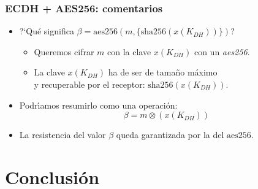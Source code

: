 \documentclass{beamer}
\theoremstyle{plain}        			%
\theoremstyle{definition}   			%
\theoremstyle{saltolinea}   			%
\begin{document}
\begin{frame}
\frametitle{ECDH + AES256: comentarios}
	\pause
	\begin{itemize}[<+-| alert@+>]
		\item ?`Qu\'e significa $\beta=\textrm{aes256}(m,\{\textrm{sha256}(x(K_{DH}))\})$?
		\begin{itemize}[<+-| alert@+>]
			\item Queremos cifrar $m$ con la clave $x(K_{DH})$ con un \emph{aes256}.
			\item La clave $x(K_{DH})$ ha de ser de tama\~no m\'aximo\\ y recuperable por el receptor: $\textrm{sha256}(x(K_{DH}))$.
		\end{itemize}
		\item Podr\'{\i}amos resumirlo como una operaci\'on: \begin{equation}
		                                                      \beta=m  \otimes  (x(K_{DH}))
		                                                     \end{equation} 
		\item La resistencia del valor $\beta$ queda garantizada por la del $\textrm{aes256}$.
	\end{itemize}
\end{frame}


\section{Conclusi\'on}
\end{document}
